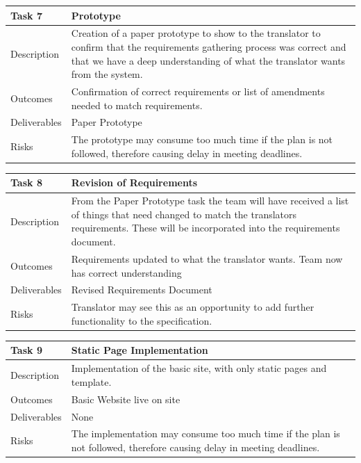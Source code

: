 \documentclass{l3proj}
\begin{document}
\begin{center}
    \begin{tabular}{ | l | p{12cm} |}
    \hline	
    Task 7 & Prototype \\ \hline
    Description & Creation of a paper prototype to show to the translator to confirm that the requirements gathering process was correct and that we have a deep understanding of what the translator wants from the system. \\ \hline   
    Outcomes & Confirmation of correct requirements or list of amendments needed to match requirements. \\ \hline
    Deliverables & Paper Prototype \\ \hline
    Risks & The prototype may consume too much time if the plan is not followed, therefore causing delay in meeting deadlines. \\ 
    \hline
    \end{tabular}
\end{center}

\begin{center}
    \begin{tabular}{ | l | p{12cm} |}
    \hline	
    Task 8 & Revision of Requirements \\ \hline
    Description & From the Paper Prototype task the team will have received a list of things that need changed to match the translators requirements. These will be incorporated into the requirements document. \\ \hline   
    Outcomes & Requirements updated to what the translator wants. Team now has correct understanding \\ \hline
    Deliverables & Revised Requirements Document \\ \hline
    Risks & Translator may see this as an opportunity to add further functionality to the specification. \\ 
    \hline
    \end{tabular}
\end{center}

\begin{center}
    \begin{tabular}{ | l | p{12cm} |}
    \hline	
    Task 9 & Static Page Implementation \\ \hline
    Description & Implementation of the basic site, with only static pages and template. \\ \hline   
    Outcomes & Basic Website live on site \\ \hline
    Deliverables & None \\ \hline
    Risks & The implementation may consume too much time if the plan is not followed, therefore causing delay in meeting deadlines. \\ 
    \hline
    \end{tabular}
\end{center}
\end{document}
